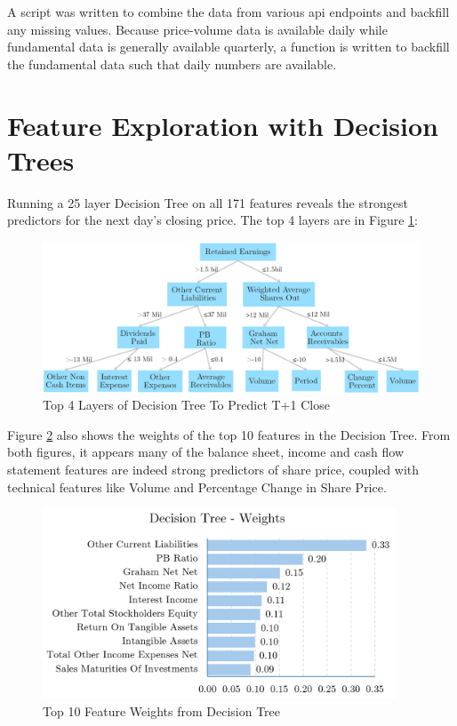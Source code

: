 \documentclass[a4paper,12pt]{report}
\numberwithin{equation}{section}
\theoremstyle{definition}
\begin{document}
  A script was written to combine the data from various api endpoints and backfill any missing values. Because price-volume data is available daily while fundamental data is generally available quarterly, a function is written to backfill the fundamental data such that daily numbers are available.



\section{Feature Exploration with Decision Trees}
Running a 25 layer Decision Tree on all 171 features reveals the strongest predictors for the next day's closing price. The top 4 layers are in Figure \ref{fig:decision_tree_features}:


\begin{figure}[H]
  \centerline{\includegraphics[width=16cm]{feature_decision_tree}}
  \caption{Top 4 Layers of Decision Tree To Predict T+1 Close}
  \label{fig:decision_tree_features}
\end{figure}

Figure \ref{fig:decision_tree_horizontal_graph} also shows the weights of the top 10 features in the Decision Tree. From both figures, it appears many of the balance sheet, income and cash flow statement features are indeed strong predictors of share price, coupled with technical features like Volume and Percentage Change in Share Price. 

\begin{figure}[H]
  \centerline{\includegraphics[width=10.5cm]{decision_tree_horizontal_graph}}
  \caption{Top 10 Feature Weights from Decision Tree}
  \label{fig:decision_tree_horizontal_graph}
\end{figure}
\end{document}
